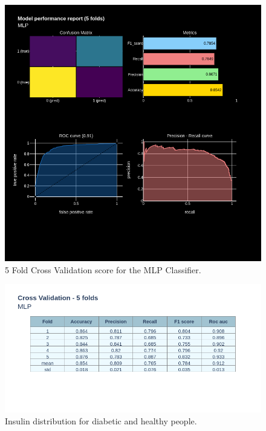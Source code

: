 \documentclass[12pt]{article}
\begin{document}
\begin{figure}[ht]
\centering
\includegraphics[width=1\textwidth]{newplot(43).png}
\caption{5 Fold Cross Validation score for the MLP Classifier.}
\end{figure}

\begin{figure}[ht]
\centering
\includegraphics[width=1\textwidth]{newplot(44).png}
\caption{Insulin distribution for diabetic and healthy people.}
\end{figure}
\end{document}
